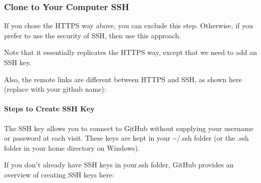 \documentclass[letterpaper,10pt,english]{sphinxmanual}
\begin{document}
\subsubsection{Clone to Your Computer \textendash{} SSH}
\label{\detokenize{guide/02_download-project:clone-to-your-computer-ssh}}
If you chose the HTTPS way above, you can exclude this step.  Otherwise, if you prefer to use the security of SSH, then use this approach.

Note that it essentially replicates the HTTPS way, except that we need to add an SSH key.


Also, the remote links are different between HTTPS and SSH, as shown here (replace  with your github name):

\begin{sphinxVerbatim}[commandchars=\\\{\}]

\end{sphinxVerbatim}


\paragraph{Steps to Create SSH Key}
\label{\detokenize{guide/02_download-project:steps-to-create-ssh-key}}
The SSH key allows you to connect to GitHub without supplying your username or password at each visit.  These keys are kept in your \textasciitilde{}/.ssh folder (or the .ssh folder in your home directory on Windows).

If you don’t already have SSH keys in your.ssh folder, GitHub provides an overview of creating SSH keys here: 
\end{document}
